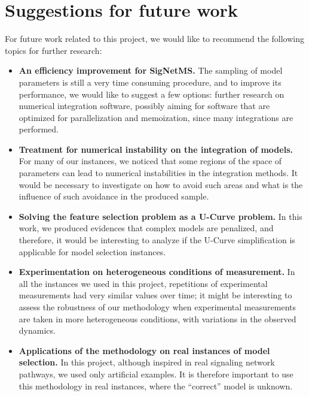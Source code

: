 \section{Suggestions for future work}
For future work related to this project, we would like to recommend the
following topics for further research:
\begin{itemize}
    \item{\bf An efficiency improvement for SigNetMS.} The sampling of model
        parameters is still a very time consuming procedure, and to
        improve its performance, we would like to suggest a few options:
        further research on numerical integration software, possibly
        aiming for software that are optimized for parallelization and
        memoization, since many integrations are performed.
    \item{\bf Treatment for numerical instability on the integration of
        models.} For many of our instances, we noticed that some regions
        of the space of parameters can lead to numerical instabilities
        in the integration methods. It would be necessary to investigate
        on how to avoid such areas and what is the influence of such
        avoidance in the produced sample.
    \item{\bf Solving the feature selection problem as a U-Curve problem.} In
        this work, we produced evidences that complex models are
        penalized, and therefore, it would be interesting to analyze if
        the U-Curve simplification is applicable for model selection
        instances.
    \item{\bf Experimentation on heterogeneous conditions of measurement.} In
        all the instances we used in this project, repetitions of 
        experimental measurements had very similar values over time; it
        might be interesting to assess the robustness of our methodology
        when experimental measurements are taken in more heterogeneous
        conditions, with variations in the observed dynamics.
    \item{\bf Applications of the methodology on real instances of model
        selection.} In this project, although inspired in real signaling
        network pathways, we used only artificial examples. It is
        therefore important to use this methodology in real instances,
        where the ``correct'' model is unknown.
\end{itemize}
